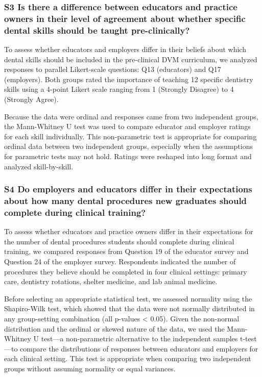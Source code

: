\documentclass[
  11pt,
  letterpaper,
  DIV=11,
  numbers=noendperiod]{scrartcl}
\numberwithin{figure}{section}
\begin{document}
\subsubsection{S3 Is there a difference between educators and practice
owners in their level of agreement about whether specific dental skills
should be taught
pre-clinically?}\label{s3-is-there-a-difference-between-educators-and-practice-owners-in-their-level-of-agreement-about-whether-specific-dental-skills-should-be-taught-pre-clinically}

To assess whether educators and employers differ in their beliefs about
which dental skills should be included in the pre-clinical DVM
curriculum, we analyzed responses to parallel Likert-scale questions:
Q13 (educators) and Q17 (employers). Both groups rated the importance of
teaching 12 specific dentistry skills using a 4-point Likert scale
ranging from 1 (Strongly Disagree) to 4 (Strongly Agree).

Because the data were ordinal and responses came from two independent
groups, the Mann-Whitney U test was used to compare educator and
employer ratings for each skill individually. This non-parametric test
is appropriate for comparing ordinal data between two independent
groups, especially when the assumptions for parametric tests may not
hold. Ratings were reshaped into long format and analyzed
skill-by-skill.

\subsubsection{S4 Do employers and educators differ in their
expectations about how many dental procedures new graduates should
complete during clinical
training?}\label{s4-do-employers-and-educators-differ-in-their-expectations-about-how-many-dental-procedures-new-graduates-should-complete-during-clinical-training}

To assess whether educators and practice owners differ in their
expectations for the number of dental procedures students should
complete during clinical training, we compared responses from Question
19 of the educator survey and Question 24 of the employer survey.
Respondents indicated the number of procedures they believe should be
completed in four clinical settings: primary care, dentistry rotations,
shelter medicine, and lab animal medicine.

Before selecting an appropriate statistical test, we assessed normality
using the Shapiro-Wilk test, which showed that the data were not
normally distributed in any group-setting combination (all p-values
\textless{} 0.05). Given the non-normal distribution and the ordinal or
skewed nature of the data, we used the Mann-Whitney U test---a
non-parametric alternative to the independent samples t-test---to
compare the distributions of responses between educators and employers
for each clinical setting. This test is appropriate when comparing two
independent groups without assuming normality or equal variances.
\end{document}
